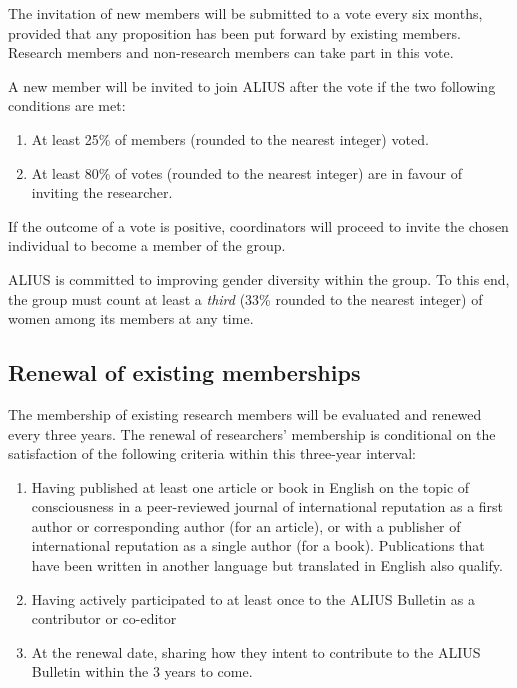 \documentclass[a4paper, 11pt]{scrartcl}
\begin{document}
\noindent The invitation of new members will be submitted to a vote every six months, provided that any proposition has been put forward by existing members. Research members and non-research members can take part in this vote.

A new member will be invited to join ALIUS after the vote if the two following conditions are met:

\begin{enumerate}
\item At least 25\% of members (rounded to the nearest integer) voted.
\item At least 80\% of votes (rounded to the nearest integer) are in favour of inviting the researcher.
\end{enumerate}

\noindent If the outcome of a vote is positive, coordinators will proceed to invite the chosen individual to become a member of the group.

ALIUS is committed to improving gender diversity within the group. To this end, the group must count at least a \emph{third} (33\% rounded to the nearest integer) of women among its members at any time.

\subsection{Renewal of existing memberships}
\label{membership_renewal}

The membership of existing research members will be evaluated and renewed every three years. The renewal of researchers' membership is conditional on the satisfaction of the following criteria within this three-year interval:

\begin{enumerate}

\item Having published at least one article or book in English on the topic of consciousness in a peer-reviewed journal of international reputation as a first author or corresponding author (for an article), or with a publisher of international reputation as a single author (for a book). Publications that have been written in another language but translated in English also qualify.

\item Having actively participated to at least once to the ALIUS Bulletin as a contributor or co-editor

\item At the renewal date, sharing how they intent to contribute to the ALIUS Bulletin within the 3 years to come.

\end{enumerate}
\end{document}
